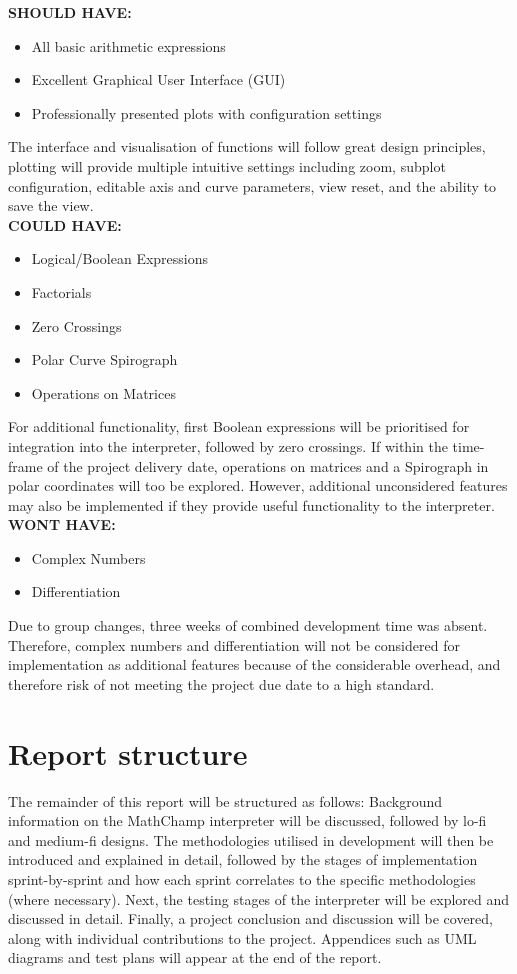 \documentclass[a4paper, oneside, 11pt]{report}
\begin{document}
\textbf{SHOULD HAVE:} \label{MoSCoW-should}
\begin{itemize}
    \item All basic arithmetic expressions 
    \item Excellent Graphical User Interface (GUI)
    \item Professionally presented plots with configuration settings
\end{itemize}

The interface and visualisation of functions will follow great design principles, plotting will provide multiple intuitive settings including zoom, subplot configuration, editable axis and curve parameters, view reset, and the ability to save the view. \\

\textbf{COULD HAVE:} \label{MoSCoW-could}
\begin{itemize}
    \item Logical/Boolean Expressions
    \item Factorials
    \item Zero Crossings
    \item Polar Curve Spirograph
    \item Operations on Matrices
\end{itemize}
For additional functionality, first Boolean expressions will be prioritised for integration into the interpreter, followed by zero crossings. If within the time-frame of the project delivery date, operations on matrices and a Spirograph in polar coordinates will too be explored. However, additional unconsidered features may also be implemented if they provide useful functionality to the interpreter.\\

\textbf{WONT HAVE:} \label{MoSCoW-wont}
\begin{itemize}
    \item Complex Numbers 
    \item Differentiation
\end{itemize}
Due to group changes, three weeks of combined development time was absent. Therefore, complex numbers and differentiation will not be considered for implementation as additional features because of the considerable overhead, and therefore risk of not meeting the project due date to a high standard.\\


\section{Report structure}
The remainder of this report will be structured as follows: Background information on the MathChamp interpreter will be discussed, followed by lo-fi and medium-fi designs. The methodologies utilised in development will then be introduced and explained in detail, followed by the stages of implementation sprint-by-sprint and how each sprint correlates to the specific methodologies (where necessary). Next, the testing stages of the interpreter will be explored and discussed in detail. Finally, a project conclusion and discussion will be covered, along with individual contributions to the project. Appendices such as UML diagrams and test plans will appear at the end of the report.
\end{document}
